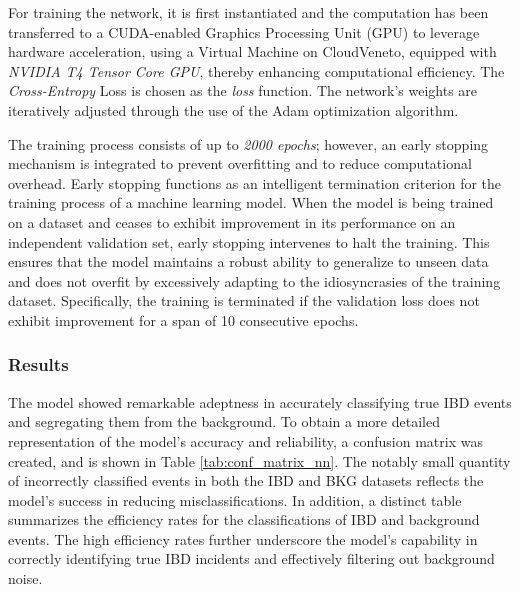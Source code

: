 For training the network, it is first instantiated and the computation has been transferred to a CUDA-enabled Graphics Processing Unit (GPU) to leverage hardware acceleration, using a Virtual Machine on CloudVeneto, equipped with \textit{NVIDIA T4 Tensor Core GPU}, thereby enhancing computational efficiency. The \textit{Cross-Entropy} Loss is chosen as the \textit{loss} function. The network's weights are iteratively adjusted through the use of the Adam optimization algorithm.

The training process consists of up to \textit{2000 epochs}; however, an early stopping mechanism is integrated to prevent overfitting and to reduce computational overhead. Early stopping functions as an intelligent termination criterion for the training process of a machine learning model. When the model is being trained on a dataset and ceases to exhibit improvement in its performance on an independent validation set, early stopping intervenes to halt the training. This ensures that the model maintains a robust ability to generalize to unseen data and does not overfit by excessively adapting to the idiosyncrasies of the training dataset. 
Specifically, the training is terminated if the validation loss does not exhibit improvement for a span of 10 consecutive epochs.


\subsubsection{Results}
The model showed remarkable adeptness in accurately classifying true IBD events and segregating them from the background. To obtain a more detailed representation of the model's accuracy and reliability, a confusion matrix was created, and is shown in Table \ref{tab:conf_matrix_nn}. The notably small quantity of incorrectly classified events in both the IBD and BKG datasets reflects the model's success in reducing misclassifications. In addition, a distinct table summarizes the efficiency rates for the classifications of IBD and background events. The high efficiency rates further underscore the model's capability in correctly identifying true IBD incidents and effectively filtering out background noise.

\vspace{-0.2cm}

